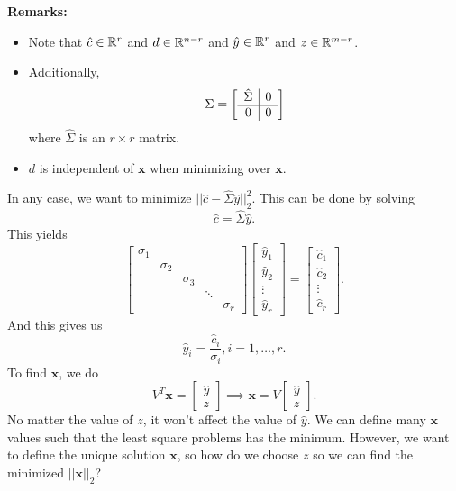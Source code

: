 \documentclass[letterpaper]{article}
\newcommand{\0}{\mathbf{0}}
\newcommand{\x}{\mathbf{x}}
\begin{document}
\textbf{Remarks:}
\begin{itemize}
    \item Note that $\hat{c} \in \mathbb{R}^r$ and $d \in \mathbb{R}^{n - r}$ and $\hat{y} \in \mathbb{R}^r$ and $z \in \mathbb{R}^{m - r}$.
    \item Additionally, \[\Sigma = \left[
        \begin{array}{c|c}
            \hat{\Sigma} & \makebox{0} \\ 
            \hline 
            \makebox{0} & \makebox{0}
        \end{array}
    \right]\] where $\hat{\Sigma}$ is an $r \times r$ matrix. 

    \item $d$ is independent of $\x$ when minimizing over $\x$. 
\end{itemize}
In any case, we want to minimize $||\hat{c} - \hat{\Sigma} \hat{y}||_2^2$. This can be done by solving \[\hat{c} = \hat{\Sigma}\hat{y}.\] This yields \[\begin{bmatrix}
    \sigma_1 & & & & \\ 
    & \sigma_2 & & & \\ 
    & & \sigma_3 & & \\ 
    & & & \ddots & \\ 
    & & & & \sigma_r
\end{bmatrix} \begin{bmatrix}
    \hat{y}_1 \\ \hat{y}_2 \\ \vdots \\ \hat{y}_r
\end{bmatrix} = \begin{bmatrix}
    \hat{c}_1 \\ \hat{c}_2 \\ \vdots \\ \hat{c}_r
\end{bmatrix}.\]
And this gives us 
\[\hat{y}_i = \frac{\hat{c}_i}{\sigma_i}, i = 1, \hdots, r.\] To find $\x$, we do \[V^T \x = \begin{bmatrix}
    \hat{y} \\ z
\end{bmatrix} \implies \x = V\begin{bmatrix}
    \hat{y} \\ z 
\end{bmatrix}.\]
No matter the value of $z$, it won't affect the value of $\hat{y}$. We can define many $\x$ values such that the least square problems has the minimum. However, we want to define the unique solution $\x$, so how do we choose $z$ so we can find the minimized $||\x||_2$? 
\end{document}
